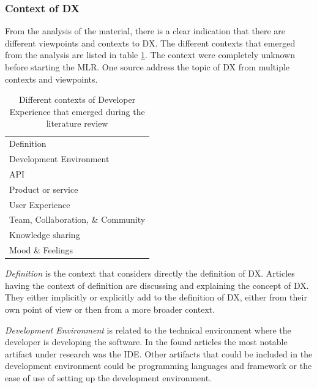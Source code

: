 \documentclass[english, 12pt, a4paper, sci, utf8, a-1b, online]{aaltothesis}
\begin{document}
\subsubsection{Context of DX}

From the analysis of the material, there is a clear indication that there are different viewpoints and contexts to DX. The different contexts that emerged from the analysis are listed in table \ref{table:contexts}. The context were completely unknown before starting the MLR. One source address the topic of DX from multiple contexts and viewpoints.

\begin{table}[ht]
  \begin{center}
    \begin{tabular}{l}
      \hline
      Definition                        \\
      Development Environment           \\
      API                               \\
      Product or service                \\
      User Experience                   \\
      Team, Collaboration, \& Community \\
      Knowledge sharing                 \\
      Mood \& Feelings                  \\
      \hline
    \end{tabular}
    \captionsetup{width=0.6\textwidth}
    \caption{Different contexts of Developer Experience that emerged during the literature review}
    \label{table:contexts}
  \end{center}
\end{table}

\textit{Definition} is the context that considers directly the definition of DX. Articles having the context of definition are discussing and explaining the concept of DX. They either implicitly or explicitly add to the definition of DX, either from their own point of view or then from a more broader context.

\textit{Development Environment} is related to the technical environment where the developer is developing the software. In the found articles the most notable artifact under research was the IDE. Other artifacts that could be included in the development environment could be programming languages and framework or the ease of use of setting up the development environment.
\end{document}
